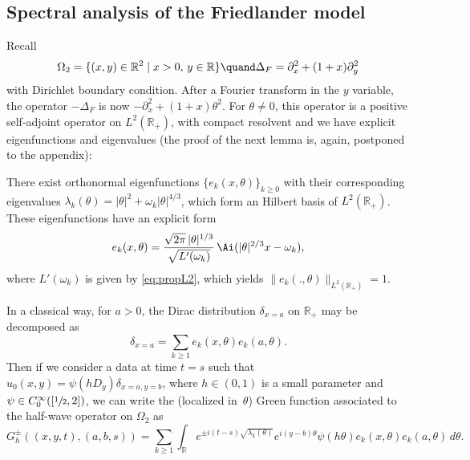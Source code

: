 \subsection{Spectral analysis of the Friedlander model}

Recall
\[
\Omega_2=\{(x,y)\in\mathbb{R}^2\mid x>0,\,y\in\mathbb{R}\}\quand
\Delta_F=\partial^{2}_{x}+(1+x)\partial^{2}_{y}
\]
with Dirichlet boundary condition. After a Fourier transform in the $y$ variable, the operator $-\Delta_{F}$ is now
$-\partial^2_x+(1+x)\theta^2$. For $\theta\neq 0$, this operator is a positive self-adjoint operator
on $L^2(\mathbb{R}_+)$, with compact resolvent and we have explicit eigenfunctions and eigenvalues (the proof of the next lemma is, again, postponed to the appendix):

\begin{lemma}\label{lemorthog}
There exist orthonormal eigenfunctions $\{e_k(x,\theta)\}_{k\geq 0}$ with their corresponding eigenvalues $\lambda_k(\theta)=|\theta|^2+\omega_k|\theta|^{4/3}$, which form an Hilbert basis of $L^{2}(\mathbb{R}_{+})$. These eigenfunctions have an explicit form
\begin{equation}\label{eig_k}
e_k(x,\theta)=\frac{\sqrt{2\pi}\,|\theta|^{1/3}}{\sqrt{L'(\omega_k)}}\,
\Ai(|\theta|^{2/3}x-\omega_k),
\end{equation}
where $L'(\omega_k)$ is given by \eqref{eq:propL2}, which yields
$\|e_k(.,\theta)\|_{L^2(\mathbb{R}_+)}=1$.
\end{lemma}

In a classical way, for $a>0$, the Dirac distribution $\delta_{x=a}$ on $\mathbb{R}_+$ may be decomposed as
\[
\delta_{x=a}=\sum_{k\geq 1} e_k(x,\theta)e_k(a,\theta).
\]
Then if we consider a data at time $t=s$ such that
$u_0(x,y)=\psi(hD_y)\delta_{x=a,y=b}$, where $h\in (0,1)$ is a small parameter and
$\psi\in C^{\infty}_0([\sfrac 12,2])$, we can write the (localized in~$\theta$) Green function associated to the half-wave operator on $\Omega_{2}$ as
\begin{equation}
\label{greenfct} G^{\pm}_{h}((x,y,t),(a,b,s))=\sum_{k\geq 1}
\int_{\mathbb{R}}e^{\pm i(t-s)\sqrt{\lambda_k(\theta)}}
e^{i(y-b)\theta}
\psi(h\theta)e_k(x,\theta)e_k(a,\theta)\,d\theta.
\end{equation}
